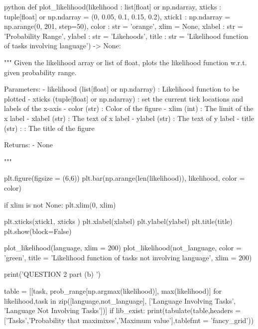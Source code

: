 \documentclass[12pt]{amsart}
\begin{document}
\begin{mintedbox}{python}
def plot_likelihood(likelihood : list[float] or np.ndarray,
                    xticks : tuple[float] or np.ndarray = (0, 0.05, 0.1, 0.15, 0.2),
                    xtick1 : np.ndarray = np.arange(0, 201, step=50),                    
                    color  : str = 'orange',
                    xlim         = None,                     
                    xlabel : str = 'Probability Range',
                    ylabel : str = 'Likehoods',
                    title  : str = 'Likelihood function of tasks involving language') -> None:

    """
    Given the likelihood array or list of float, plots the likelihood function w.r.t. 
    given probability range.

        Parameters:
            - likelihood (list[float] or np.ndarray) : Likelihood function to be plotted
            - xticks (tuple[float] or np.ndarray)    : set the current tick locations and labels of the x-axis
            - color (str)                            : Color of the figure
            - xlim (int)                             : The limit of the x label
            - xlabel (str)                           : The text of x label
            - ylabel (str)                           : The text of y label
            - title (str) :                          : The title of the figure

        Returns:
            - None

    """
    
    plt.figure(figsize = (6,6))
    plt.bar(np.arange(len(likelihood)), likelihood, color = color)  

    if xlim is not None:  
        plt.xlim(0, xlim)
    
    plt.xticks(xtick1, xticks )
    plt.xlabel(xlabel)
    plt.ylabel(ylabel)
    plt.title(title)
    plt.show(block=False)

plot_likelihood(language,
                xlim = 200)
plot_likelihood(not_language,
                color = 'green',
                title = 'Likelihood function of tasks not involving language',
                xlim = 200)

print('QUESTION 2 part (b) \n')

table = [[task, prob_range[np.argmax(likelihood)], max(likelihood)] for likelihood,task in zip([language,not_language], ['Language Involving Tasks', 'Language Not Involving Tasks'])]
if lib_exist:
    print(tabulate(table,headers = ['Tasks','Probability that maximixes','Maximum value'],tablefmt = 'fancy_grid'))


\end{mintedbox}
\end{document}
